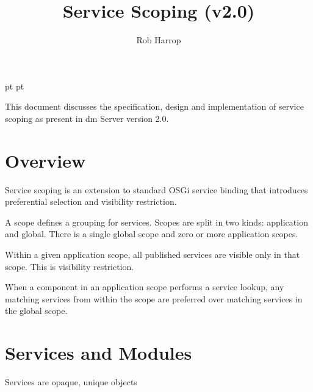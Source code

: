 \documentclass[a4paper]{article}
\begin{document}
 pt
 pt

\title{Service Scoping (v2.0)}
\author{Rob Harrop}
\maketitle
\thispagestyle{myheadings}
\setcounter{page}{0}

This document discusses the specification, design and implementation of service scoping as present in dm Server version 2.0.
\clearpage
{}
\tableofcontents

\newcommand{\true}{true}
\newcommand{\false}{false}
\renewcommand{\empty}{\emptyset}

\clearpage
{}
\section{Overview}

Service scoping is an extension to standard OSGi service binding that introduces preferential selection and visibility restriction.

A scope defines a grouping for services. Scopes are split in two kinds: application and global. There is a single global scope and zero or more application scopes.

Within a given application scope, all published services are visible only in that scope. This is visibility restriction.

When a component in an application scope performs a service lookup, any matching services from within the scope are preferred over matching services in the global scope.

\clearpage
\section{Services and Modules}

Services are opaque, unique objects
\begin{zed}
[Service]
\end{zed}
\end{document}
